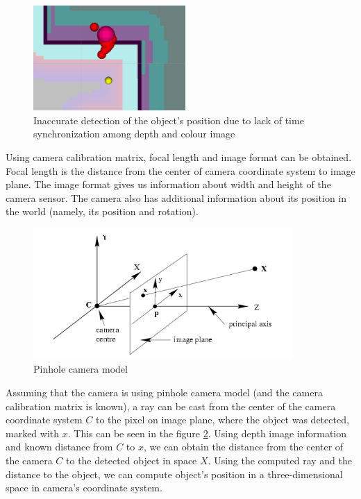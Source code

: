 \documentclass[12pt,a4paper]{article}
\begin{document}
	\begin{figure}[h]
		\centering
		\includegraphics[height=4cm]{images/detections}
		\caption{Inaccurate detection of the object's position due to lack of time synchronization among depth and colour image}
		\label{fig:non_synchronized_raw_detection}
	\end{figure}

	Using camera calibration matrix, focal length and image format can be obtained. Focal length is the distance from the center of camera coordinate system to image plane. The image format gives us information about width and height of the camera sensor. The camera also has additional information about its position in the world (namely, its position and rotation). \\

	\begin{figure}[h]
		\centering
		\includegraphics[height=5cm]{images/pinhole_camera_model.png}
		\caption{Pinhole camera model}
		\label{fig:pinhole_camera_model}
	\end{figure}
	
	
	Assuming that the camera is using pinhole camera model (and the camera calibration matrix is known), a ray can be cast from the center of the camera coordinate system $C$ to the pixel on image plane, where the object was detected, marked with $x$. This can be seen in the figure \ref{fig:pinhole_camera_model}. Using depth image information and known distance from $C$ to $x$, we can obtain the distance from the center of the camera $C$ to the detected object in space $X$. Using the computed ray and the distance to the object, we can compute object's position in a three-dimensional space in camera's coordinate system. \\
	
\end{document}
